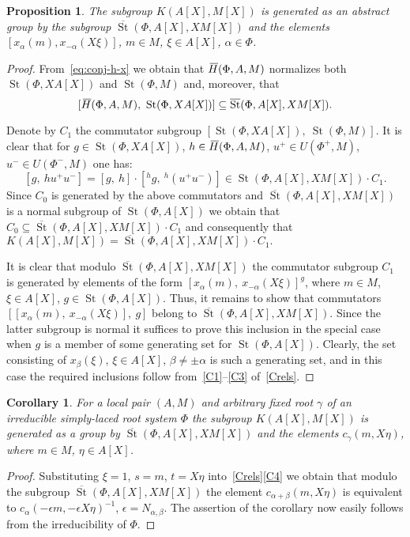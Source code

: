 \documentclass[oneside, 8pt]{amsart}
\newtheorem{prop}[lemma]{Proposition}
\newtheorem{corollary}[lemma]{Corollary}
\theoremstyle{remark}
\theoremstyle{definition}
\numberwithin{lemma}{section}
\numberwithin{prop}{section}
\numberwithin{corollary}{section}
\numberwithin{externaltheorem}{section}
\DeclareMathOperator{\St}{St}
\newcommand{\myol}[2][3]{{}\mkern#1mu\overline{\mkern-#1mu#2}}
\numberwithin{equation}{section}
\begin{document}
\begin{prop} \label{Kgen} The subgroup $K(A[X], M[X])$ is generated as an abstract group by the subgroup $\overline{\St}(\Phi, A[X], XM[X])$ and
 the elements $[x_\alpha(m), x_{-\alpha}(X\xi)]$, $m \in M$, $\xi \in A[X]$, $\alpha \in \Phi$. \end{prop}
\begin{proof} From~\eqref{eq:conj-h-x} we obtain that $\myol{H}(\Phi, A, M)$ normalizes both $\St(\Phi, XA[X])$ and $\St(\Phi, M)$ and, moreover, that \[[\myol{H}(\Phi, A, M),\ \St(\Phi, XA[X])] \subseteq \overline{\St}(\Phi, A[X], XM[X]).\]

Denote by $C_1$ the commutator subgroup $[\St(\Phi, XA[X]),\ \St(\Phi, M)]$.
It is clear that for $g \in \St(\Phi, XA[X])$, $h \in \myol{H}(\Phi, A, M)$, $u^+ \in U(\Phi^+, M)$, $u^- \in U(\Phi^-, M)$ one has:
\[ [g,\ h u^+ u^-] = [g,\ h] \cdot [{}^{h}\!g,\ {}^{h}\!(u^+u^-)] \in \St(\Phi, A[X], XM[X]) \cdot C_1.\]
Since $C_0$ is generated by the above commutators and $\overline{\St}(\Phi, A[X], XM[X])$ is a normal subgroup of $\St(\Phi, A[X])$
we obtain that $C_0 \subseteq \overline{\St}(\Phi, A[X], XM[X]) \cdot C_1$ and consequently that
$K(A[X], M[X]) = \overline{\St}(\Phi, A[X], XM[X]) \cdot C_1.$
 
It is clear that modulo $\overline{\St}(\Phi, A[X], XM[X])$ the commutator subgroup $C_1$ is generated by elements of the form $[x_\alpha(m),\ x_{-\alpha}(X\xi)]^g$, where $m \in M$, $\xi \in A[X]$, $g \in \St(\Phi, A[X])$.
Thus, it remains to show that commutators $[[x_\alpha(m),\ x_{-\alpha}(X\xi)],\ g]$ belong to $\overline{\St}(\Phi, A[X], XM[X])$.
Since the latter subgroup is normal it suffices to prove this inclusion in the special case when $g$ is a member of some generating set for $\St(\Phi, A[X])$.
Clearly, the set consisting of $x_\beta(\xi)$, $\xi \in A[X]$, $\beta \neq \pm \alpha$ is such a generating set, 
 and in this case the required inclusions follow from~\ref{C1}--\ref{C3} of~\cref{Crels}. \end{proof}

\begin{corollary} \label{Kgen-strong} For a local pair $(A, M)$ and arbitrary fixed root $\gamma$ of an irreducible simply-laced root system $\Phi$ the subgroup $K(A[X], M[X])$ is generated as a group by $\overline{\St}(\Phi, A[X], XM[X])$ and the elements $c_{\gamma}(m, X\eta)$, where $m \in M$, $\eta \in A[X]$. \end{corollary}
\begin{proof} Substituting $\xi = 1$, $s = m$, $t = X\eta$ into~\cref{Crels}\ref{C4} we obtain that modulo the subgroup
 $\overline{\St}(\Phi, A[X], XM[X])$ the element $c_{\alpha + \beta}(m, X\eta)$ is equivalent to $c_{\alpha}(-\epsilon m, -\epsilon X \eta)^{-1}$, $\epsilon = N_{\alpha, \beta}$. The assertion of the corollary now easily follows from the irreducibility of $\Phi$. \end{proof}   
\end{document}
